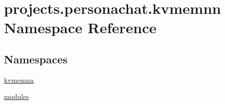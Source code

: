 \hypertarget{namespaceprojects_1_1personachat_1_1kvmemnn}{}\section{projects.\+personachat.\+kvmemnn Namespace Reference}
\label{namespaceprojects_1_1personachat_1_1kvmemnn}
\subsection*{Namespaces}
\begin{DoxyCompactItemize}
\item 
 \hyperlink{namespaceprojects_1_1personachat_1_1kvmemnn_1_1kvmemnn}{kvmemnn}
\item 
 \hyperlink{namespaceprojects_1_1personachat_1_1kvmemnn_1_1modules}{modules}
\end{DoxyCompactItemize}
